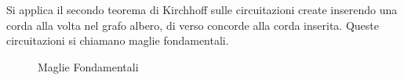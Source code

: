 \documentclass{article}
\numberwithin{equation}{subsection}
\begin{document}
Si applica il secondo teorema di Kirchhoff sulle circuitazioni create inserendo una corda alla volta nel grafo albero, di verso concorde alla corda inserita. Queste 
circuitazioni si chiamano maglie fondamentali. 
\begin{figure}[H]%
    \centering  
    \qquad
    \label{fig:maglia-fondamentale-1-2}
\end{figure}
\begin{figure}[H]%
    \centering  
    \qquad
    \caption{Maglie Fondamentali}
    \label{fig:maglia-fondamentale-3-4}
\end{figure}
\end{document}
